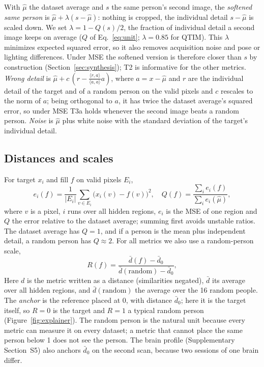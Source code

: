 With $\hat\mu$ the dataset average and $s$ the same person's second image, the \emph{softened same person} is $\hat\mu+\lambda(s-\hat\mu)$: nothing is cropped, the individual detail $s-\hat\mu$ is scaled down.
We set $\lambda=1-Q(s)/2$, the fraction of individual detail a second image keeps on average ($Q$ of Eq.~\ref{eq:unit}; $\lambda=0.85$ for QTIM).
This $\lambda$ minimizes expected squared error, so it also removes acquisition noise and pose or lighting differences.
Under \ac{MSE} the softened version is therefore closer than $s$ by construction (Section~\ref{sec:synthesis}); T2 is informative for the other metrics.
\emph{Wrong detail} is $\hat\mu+c\,(r-\frac{\langle r,a\rangle}{\langle a,a\rangle}a)$, where $a=x-\hat\mu$ and $r$ are the individual detail of the target and of a random person on the valid pixels and $c$ rescales to the norm of $a$; being orthogonal to $a$, it has twice the dataset average's squared error, so under \ac{MSE} T3a holds whenever the second image beats a random person.
\emph{Noise} is $\hat\mu$ plus white noise with the standard deviation of the target's individual detail.

\subsection{Distances and scales}
For target $x_i$ and fill $f$ on valid pixels $E_i$,
\begin{equation}
e_i(f)=\frac{1}{|E_i|}\sum_{v\in E_i}\bigl(x_i(v)-f(v)\bigr)^2,\quad
Q(f)=\frac{\sum_i e_i(f)}{\sum_i e_i(\hat\mu)},
\label{eq:unit}
\end{equation}
where $v$ is a pixel, $i$ runs over all hidden regions, $e_i$ is the \ac{MSE} of one region and $Q$ the error relative to the dataset average; summing first avoids unstable ratios.
The dataset average has $Q=1$, and if a person is the mean plus independent detail, a random person has $Q\approx2$.
For all metrics we also use a random-person scale,
\begin{equation}
R(f)=\frac{\bar d(f)-\bar d_0}{\bar d(\mathrm{random})-\bar d_0},
\label{eq:anchors}
\end{equation}
Here $d$ is the metric written as a distance (similarities negated), $\bar d$ its average over all hidden regions, and $\bar d(\mathrm{random})$ the average over the 16 random people.
The \emph{anchor} is the reference placed at 0, with distance $\bar d_0$; here it is the target itself, so $R=0$ is the target and $R=1$ a typical random person (Figure~\ref{fig:explainer}).
The random person is the natural unit because every metric can measure it on every dataset; a metric that cannot place the same person below 1 does not see the person.
The brain profile (Supplementary Section~S5) also anchors $\bar d_0$ on the second scan, because two sessions of one brain differ.

